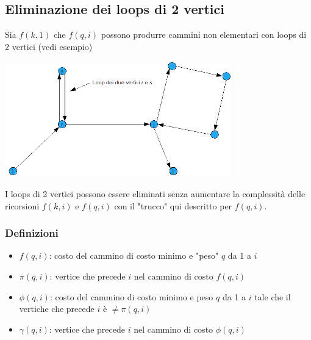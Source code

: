 \subsection{Eliminazione dei loops di 2 vertici}
Sia $f(k,1)$ che $f(q,i)$ possono produrre cammini non elementari con loops di 2 vertici (vedi esempio)

\centerline{\includegraphics[height=5cm]{images/graph48.png}}
I loops di 2 vertici possono essere eliminati senza aumentare la complessità delle ricorsioni $f(k,i)$ e $f(q,i)$ con il "trucco" qui descritto per $f(q,i)$.

\subsubsection{Definizioni}
\begin{itemize}
	\item $f(q,i)$: costo del cammino di costo minimo e "peso" $q$ da 1 a $i$
	\item $\pi(q,i)$: vertice che precede $i$ nel cammino di costo $f(q,i)$
	\item $\phi(q,i)$: costo del cammino di costo minimo e peso $q$ da 1 a $i$ tale che il vertiche che precede $i$ è $\neq\pi(q,i)$
	\item $\gamma(q,i)$: vertice che precede $i$ nel cammino di costo $\phi(q,i)$
\end{itemize}

